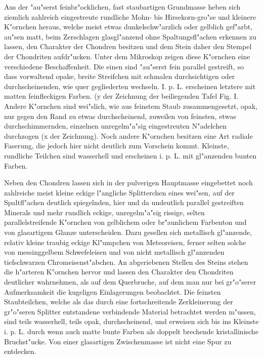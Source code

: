 \documentclass[a4paper, 11pt, oneside]{article}
\begin{document}
Aus der "au"serst feinbr"ocklichen, fast staubartigen Grundmasse heben sich ziemlich zahlreich eingestreute rundliche Mohn- bis Hirsekorn-gro"se und kleinere K"ornchen heraus, welche meist etwas dunkelschw"arzlich oder gelblich gef"arbt, au"sen matt, beim Zerschlagen glasgl"anzend ohne Spaltungsfl"achen erkennen zu lassen, den Charakter der Chondren besitzen und dem Stein daher den Stempel der Chondriten aufdr"ucken. Unter dem Mikroskop zeigen diese K"ornchen eine verschiedene Beschaffenheit. Die einen sind "au"serst fein parallel gestreift, so dass vorwaltend opake, breite Streifchen mit schmalen durchsichtigen oder durchscheinenden, wie quer gegliederten wechseln. I. p. L. erscheinen letztere mit matten feinfleckigen Farben. (y der Zeichnung der beiliegenden Tafel Fig. I. Andere K"ornchen sind wei"slich, wie aus feinstem Staub zusammengesetzt, opak, nur gegen den Rand zu etwas durchscheinend, zuweilen von feinsten, etwas durchschimmernden, einzelnen unregelm"a"sig eingestreuten N"adelchen durchzogen (x der Zeichnung). Noch andere K"ornchen besitzen eine Art radiale Faserung, die jedoch hier nicht deutlich zum Vorschein kommt. Kleinste, rundliche Teilchen sind wasserhell und erscheinen i. p. L. mit gl"anzenden bunten Farben.

Neben den Chondren lassen sich in der pulverigen Hauptmasse eingebettet noch zahlreiche meist kleine eckige l"angliche Splitterchen eines wei"sen, auf der Spaltfl"achen deutlich spiegelnden, hier und da undeutlich parallel gestreiften Minerals und mehr rundlich eckige, unregelm"a"sig rissige, selten parallelstreifende K"ornchen von gelblichem oder br"aunlichem Farbenton und von glasartigem Glanze unterscheiden. Dazu gesellen sich metallisch gl"anzende, relativ kleine traubig eckige Kl"umpchen von Meteoreisen, ferner selten solche von messinggelbem Schwefeleisen und von nicht metallisch gl"anzenden tiefschwarzen Chromeisenst"abchen. An abgeriebenen Stellen des Steins stehen die h"arteren K"ornchen hervor und lassen den Charakter den Chondriten deutlicher wahrnehmen, als auf dem Querbruche, auf dem man nur bei gr"o"serer Aufmerksamkeit die kugeligen Einlagerungen beobachtet. Die feinsten Staubteilchen, welche als das durch eine fortschreitende Zerkleinerung der gr"o"seren Splitter entstandene verbindende Material betrachtet werden m"ussen, sind teils wasserhell, teils opak, durchscheinend, und erweisen sich bis ins Kleinste i. p. L. durch wenn auch matte bunte Farben als doppelt brechende kristallinische Bruchst"ucke. Von einer glasartigen Zwischenmasse ist nicht eine Spur zu entdecken.
\end{document}
